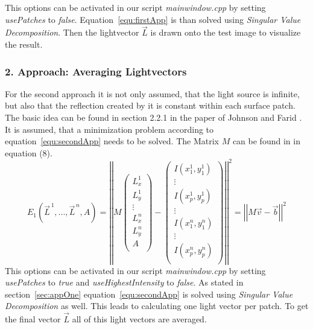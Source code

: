 This options can be activated in our script \textit{mainwindow.cpp} by setting \textit{usePatches} to \textit{false}. Equation~\ref{equ:firstApp} is than solved using \textit{Singular Value Decomposition}. Then the lightvector $\vec{L}$ is drawn onto the test image to visualize the result.  

\subsubsection{2. Approach: Averaging Lightvectors}\label{sec:appTwo}
For the second approach it is not only assumed, that the light source is infinite, but also that the reflection created by it is constant within each surface patch. The basic idea can be found in section 2.2.1 in the paper of Johnson and Farid \cite{Johnson}.\\
It is assumed, that a minimization problem according to equation~\ref{equ:secondApp} needs to be solved. The Matrix $M$ can be found in \cite{Johnson} in equation (8). \\

\begin{equation}
\label{equ:secondApp}
E_{1}(\vec{L}^{\,1} , ... , \vec{L}^{\,n} , A) = 
\left\vert \left\vert 
M
\begin{pmatrix}
L^{1}_{x} \\
L^{1}_{y} \\
\vdots  \\
L^{n}_{x} \\
L^{n}_{y} \\
A \\
\end{pmatrix} -
\begin{pmatrix}
I(x^{1}_{1} , y^{1}_{1}) \\
\vdots  \\
I(x^{1}_{p} , y^{1}_{p}) \\
\vdots  \\
I(x^{n}_{1} , y^{n}_{1}) \\
\vdots  \\
I(x^{n}_{p} , y^{n}_{p}) \\
\end{pmatrix}
 \right\vert\right\vert^{2}
 = \left\vert \left\vert  M\vec{v}-\vec{b}  \right\vert\right\vert^{2}
\end{equation}
This options can be activated in our script \textit{mainwindow.cpp} by setting \textit{usePatches} to \textit{true} and \textit{useHighestIntensity} to \textit{false}.
As stated in section~\ref{sec:appOne} equation~\ref{equ:secondApp} is solved using \textit{Singular Value Decomposition} as well. This leads to calculating one light vector per patch. To get the final vector $\vec{L}$ all of this light vectors are averaged.


